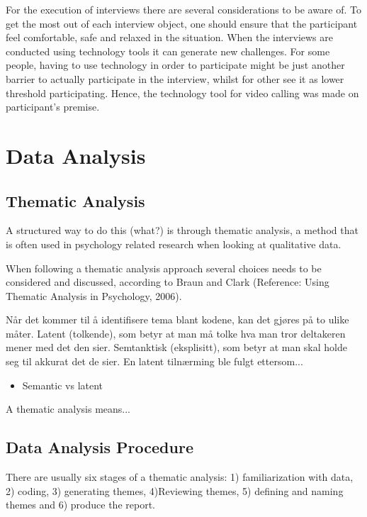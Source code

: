         For the execution of interviews there are several considerations to be aware of. To get the most out of each interview object, one should ensure that the participant feel comfortable, safe and relaxed in the situation. When the interviews are conducted using technology tools it can generate new challenges. For some people, having to use technology in order to participate might be just another barrier to actually participate in the interview, whilst for other see it as lower threshold participating. Hence, the technology tool for video calling was made on participant's premise. 

\section{Data Analysis}
    \subsection{Thematic Analysis}
    A structured way to do this (what?) is through thematic analysis, a method that is often used in psychology related research when looking at qualitative data. 
    
    When following a thematic analysis approach several choices needs to be considered and discussed, according to Braun and Clark (Reference: Using Thematic Analysis in Psychology, 2006). 
  
    Når det kommer til å identifisere tema blant kodene, kan det gjøres på to ulike måter. Latent (tolkende), som betyr at man må tolke hva man tror deltakeren mener med det den sier.  Semtanktisk (eksplisitt), som betyr at man skal holde seg til akkurat det de sier. En latent tilnærming ble fulgt ettersom... 
    
   
    

    
    
    
    
\begin{itemize}
\item     Semantic vs latent
\end{itemize}

    A thematic analysis means... 
    
    \subsection{Data Analysis Procedure}
    There are usually six stages of a thematic analysis: 1) familiarization with data, 2) coding, 3) generating themes, 4)Reviewing themes, 5) defining and naming themes and 6) produce the report.
    
